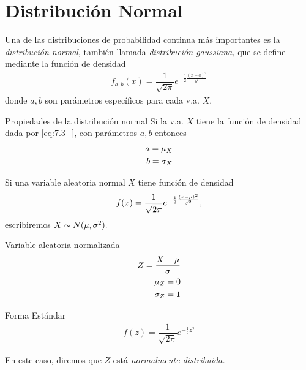 \section{Distribución Normal}

 Una de las distribuciones de probabilidad continua más importantes es la \emph{distribución normal}, también llamada \emph{distribución gaussiana,} que se define mediante la función de densidad
 \begin{align}
  \label{eq:7.3_}
  f_{a,b}(x)=\dfrac{1}{\sqrt{2\pi}}e^{-\frac{1}{2}\frac{(x-a)^{2}}{b^{2}}}
 \end{align}
donde $a,b$ son parámetros específicos para cada v.a. $X.$

{Propiedades de la distribución normal}
 Si la v.a. $X$ tiene la función de densidad dada por \eqref{eq:7.3_}, con parámetros $a,b$ entonces
 \begin{align}
  a = \mu_{X}\\
  b = \sigma_{X}
 \end{align}



 Si una variable aleatoria normal $X$ tiene función de densidad
  \begin{align}
  \label{eq:7.3_}
  f(x)=\dfrac{1}{\sqrt{2\pi}}e^{-\frac{1}{2}\frac{(x-\mu)^{2}}{\sigma^{2}}},
 \end{align}
 escribiremos $X\sim N(\mu, \sigma^{2}).$


{Variable aleatoria normalizada}
 \begin{align}
  \label{van}
  Z = \dfrac{X-\mu}{\sigma}\\
  \mu_{Z}=0 \\
  \sigma_{Z}=1
 \end{align}


{Forma Estándar}
 \begin{align}
  \label{eq:7.4}
  f(z)=\dfrac{1}{\sqrt{2\pi}}e^{-\frac{1}{2}z^{2}}
 \end{align}


En este caso, diremos que $Z$ está \emph{normalmente distribuida.}



